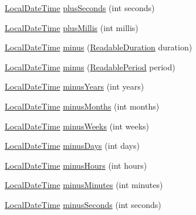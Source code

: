 \begin{DoxyCompactItemize}
\item 
\hyperlink{classorg_1_1joda_1_1time_1_1_local_date_time}{Local\-Date\-Time} \hyperlink{classorg_1_1joda_1_1time_1_1_local_date_time_a9f538d5e7ac06019a478534415fb26a7}{plus\-Seconds} (int seconds)
\item 
\hyperlink{classorg_1_1joda_1_1time_1_1_local_date_time}{Local\-Date\-Time} \hyperlink{classorg_1_1joda_1_1time_1_1_local_date_time_adce2939af4d5675065f42e31cb24548a}{plus\-Millis} (int millis)
\item 
\hyperlink{classorg_1_1joda_1_1time_1_1_local_date_time}{Local\-Date\-Time} \hyperlink{classorg_1_1joda_1_1time_1_1_local_date_time_a1da63793ab1e6233a3503626a70c92bb}{minus} (\hyperlink{interfaceorg_1_1joda_1_1time_1_1_readable_duration}{Readable\-Duration} duration)
\item 
\hyperlink{classorg_1_1joda_1_1time_1_1_local_date_time}{Local\-Date\-Time} \hyperlink{classorg_1_1joda_1_1time_1_1_local_date_time_aade754eabc5e49ebb110e7368ca6ecbd}{minus} (\hyperlink{interfaceorg_1_1joda_1_1time_1_1_readable_period}{Readable\-Period} period)
\item 
\hyperlink{classorg_1_1joda_1_1time_1_1_local_date_time}{Local\-Date\-Time} \hyperlink{classorg_1_1joda_1_1time_1_1_local_date_time_af1b8a9d072fc4a22792276b4dc4ca959}{minus\-Years} (int years)
\item 
\hyperlink{classorg_1_1joda_1_1time_1_1_local_date_time}{Local\-Date\-Time} \hyperlink{classorg_1_1joda_1_1time_1_1_local_date_time_ade6613534fa13df26166f903d8c1b39e}{minus\-Months} (int months)
\item 
\hyperlink{classorg_1_1joda_1_1time_1_1_local_date_time}{Local\-Date\-Time} \hyperlink{classorg_1_1joda_1_1time_1_1_local_date_time_a82762b29f3aee50a2e0330cbcf7ce4ef}{minus\-Weeks} (int weeks)
\item 
\hyperlink{classorg_1_1joda_1_1time_1_1_local_date_time}{Local\-Date\-Time} \hyperlink{classorg_1_1joda_1_1time_1_1_local_date_time_afe664ea750e0136b68da44bb25457018}{minus\-Days} (int days)
\item 
\hyperlink{classorg_1_1joda_1_1time_1_1_local_date_time}{Local\-Date\-Time} \hyperlink{classorg_1_1joda_1_1time_1_1_local_date_time_abfc4ca7cf31d7939eda58a6ab9ddf2b0}{minus\-Hours} (int hours)
\item 
\hyperlink{classorg_1_1joda_1_1time_1_1_local_date_time}{Local\-Date\-Time} \hyperlink{classorg_1_1joda_1_1time_1_1_local_date_time_a8a8e20eb1fe535e68f8b187d2b4634f0}{minus\-Minutes} (int minutes)
\item 
\hyperlink{classorg_1_1joda_1_1time_1_1_local_date_time}{Local\-Date\-Time} \hyperlink{classorg_1_1joda_1_1time_1_1_local_date_time_acbfebc11eaad935e9d800b3c5f653edd}{minus\-Seconds} (int seconds)

\end{DoxyCompactItemize}
